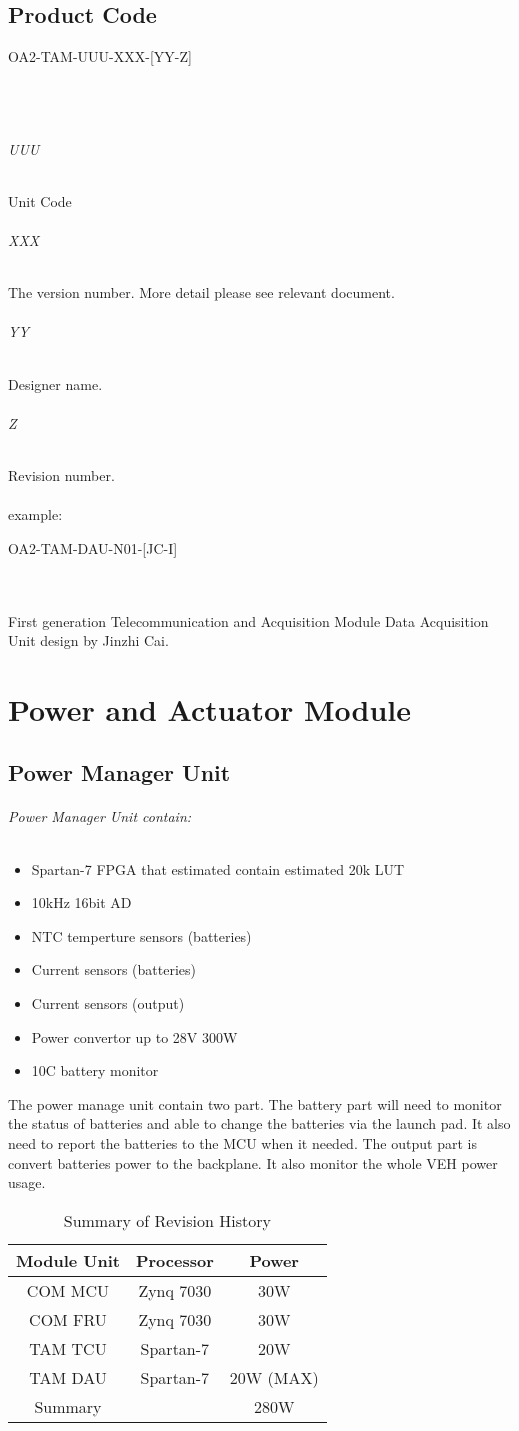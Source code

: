 \documentclass[12pt,article]{memoir}
\begin{document}
\section{Product Code}
\begin{LARGE}
OA2-TAM-UUU-XXX-[YY-Z]
\end{LARGE}\\\\
\subparagraph{UUU}
Unit Code
\subparagraph{XXX}
The version number. More detail please see relevant document.
\subparagraph{YY}
Designer name.
\subparagraph{Z}
Revision number.\\\\
example: 
\begin{large}
OA2-TAM-DAU-N01-[JC-I]
\end{large}\\\\
First generation Telecommunication and Acquisition Module Data Acquisition Unit design by Jinzhi Cai.
\newpage
\chapter{Power and Actuator Module}
\section{Power Manager Unit}
\subparagraph{Power Manager Unit contain:}
\begin{itemize}
	\item Spartan-7 FPGA that estimated contain estimated 20k LUT
	\item 10kHz 16bit AD
	\item NTC temperture sensors  (batteries)
	\item Current sensors  (batteries)
	\item Current sensors  (output)
	\item Power convertor up to 28V 300W
	\item 10C battery monitor
\end{itemize}
The power manage unit contain two part. The battery part will need to monitor the status of batteries and able to change the batteries via the launch pad. It also need to report the batteries to the MCU when it needed. The output part is convert batteries power to the backplane. It also monitor the whole VEH power usage.
\begin{table}[H]
	\centering
	\begin{tabu}{ c | c | c }
		Module Unit & Processor & Power\\ \hline
		 COM MCU & Zynq 7030 & 30W\\
		 COM FRU & Zynq 7030 & 30W\\
		 TAM TCU & Spartan-7 & 20W\\
		 TAM DAU & Spartan-7 & 20W (MAX)\\ \hline
		 Summary &   & 280W\\
	\end{tabu}
	\caption{Summary of Revision History}
	\label{tab:slc}
\end{table}
\end{document}
